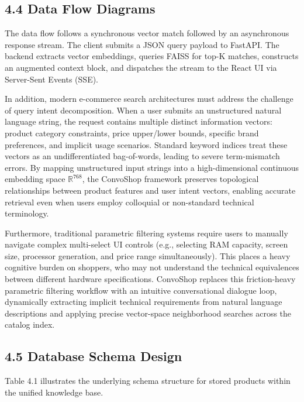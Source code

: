 \documentclass[12pt,a4paper]{article}
\begin{document}
\subsection*{4.4 Data Flow Diagrams}
\label{sec:4.4}
The data flow follows a synchronous vector match followed by an asynchronous response stream. The client submits a JSON query payload to FastAPI. The backend extracts vector embeddings, queries FAISS for top-K matches, constructs an augmented context block, and dispatches the stream to the React UI via Server-Sent Events (SSE).



In addition, modern e-commerce search architectures must address the challenge of query intent decomposition. When a user submits an unstructured natural language string, the request contains multiple distinct information vectors: product category constraints, price upper/lower bounds, specific brand preferences, and implicit usage scenarios. Standard keyword indices treat these vectors as an undifferentiated bag-of-words, leading to severe term-mismatch errors. By mapping unstructured input strings into a high-dimensional continuous embedding space $\mathbb{R}^{768}$, the ConvoShop framework preserves topological relationships between product features and user intent vectors, enabling accurate retrieval even when users employ colloquial or non-standard technical terminology.

Furthermore, traditional parametric filtering systems require users to manually navigate complex multi-select UI controls (e.g., selecting RAM capacity, screen size, processor generation, and price range simultaneously). This places a heavy cognitive burden on shoppers, who may not understand the technical equivalences between different hardware specifications. ConvoShop replaces this friction-heavy parametric filtering workflow with an intuitive conversational dialogue loop, dynamically extracting implicit technical requirements from natural language descriptions and applying precise vector-space neighborhood searches across the catalog index.

\subsection*{4.5 Database Schema Design}
\label{sec:4.5}
Table 4.1 illustrates the underlying schema structure for stored products within the unified knowledge base.
\end{document}
